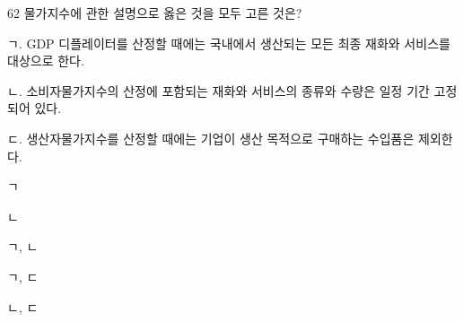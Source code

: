 \begin{question}{62}
물가지수에 관한 설명으로 옳은 것을 모두 고른 것은?
\begin{framedtext}
ㄱ. GDP 디플레이터를 산정할 때에는 국내에서 생산되는 모든 최종 재화와 서비스를 대상으로 한다. \par
ㄴ. 소비자물가지수의 산정에 포함되는 재화와 서비스의 종류와 수량은 일정 기간 고정되어 있다. \par
ㄷ. 생산자물가지수를 산정할 때에는 기업이 생산 목적으로 구매하는 수입품은 제외한다.
\end{framedtext}
\begin{choices}
  \item ㄱ
  \item ㄴ
  \item ㄱ, ㄴ
  \item ㄱ, ㄷ
  \item ㄴ, ㄷ
\end{choices}
\end{question}
